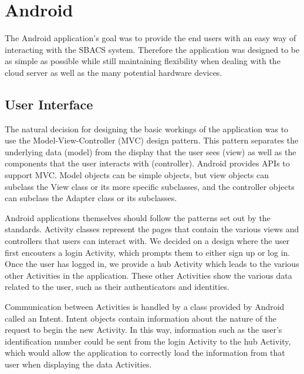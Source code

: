 \documentclass[12pt]{report}
\begin{document}


\section{Android}

The Android application's goal was to provide the end users with an easy way of interacting with the SBACS system.
Therefore the application was designed to be as simple as possible while still maintaining flexibility when dealing with
the cloud server as well as the many potential hardware devices.


\subsection{User Interface}

The natural decision for designing the basic workings of the application was to use the Model-View-Controller (MVC) 
design pattern. This pattern separates the underlying data (model) from the display that the user sees (view) as well as
the components that the user interacts with (controller). Android provides APIs to support MVC. Model objects can be
simple objects, but view objects can subclass the View class or its more specific subclasses, and the controller
objects can subclass the Adapter class or its subclasses.

Android applications themselves should follow the patterns set out by the standards. Activity classes represent the
pages that contain the various views and controllers that users can interact with. We decided on a design where the user
first encouters a login Activity, which prompts them to either sign up or log in. Once the user has logged in, we
provide a hub Activity which leads to the various other Activities in the application. These other Activities show the
various data related to the user, such as their authenticators and identities.

Communication between Activities is handled by a class provided by Android called an Intent. Intent objects contain
information about the nature of the request to begin the new Activity. In this way, information such as the user's
identification number could be sent from the login Activity to the hub Activity, which would allow the application to
correctly load the information from that user when displaying the data Activities.
\end{document}
